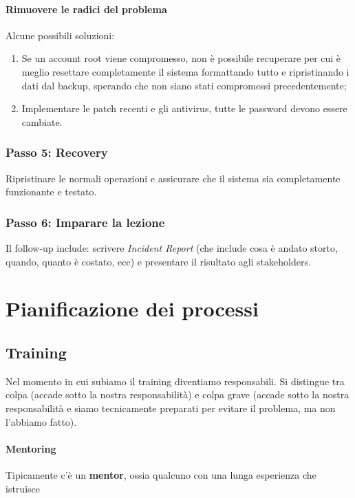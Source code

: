 \paragraph*{Rimuovere le radici del problema}

Alcune possibili soluzioni:
\begin{enumerate}
\item Se un account root viene compromesso, non è possibile recuperare per cui è
meglio resettare completamente il sistema formattando tutto e ripristinando i
dati dal backup, sperando che non siano stati compromessi precedentemente;
\item Implementare le patch recenti e gli antivirus, tutte le password devono
essere cambiate.
\end{enumerate}

\subsubsection{Passo 5: Recovery}

Ripristinare le normali operazioni e assicurare che il sistema sia completamente
funzionante e testato.

\subsubsection{Passo 6: Imparare la lezione}

Il follow-up include: scrivere \textit{Incident Report} (che include cosa è andato storto,
quando, quanto è costato, ecc) e presentare il risultato agli stakeholders.

\section{Pianificazione dei processi}
\label{IRBC:pp}

\subsection{Training}

Nel momento in cui subiamo il training diventiamo responsabili. Si distingue tra
colpa (accade sotto la nostra responsabilità) e colpa grave (accade sotto la
nostra responsabilità e siamo tecnicamente preparati per evitare il problema, ma
non l'abbiamo fatto).

\paragraph*{Mentoring} Tipicamente c'è un \textbf{mentor}, ossia qualcuno con
una lunga esperienza che istruisce

